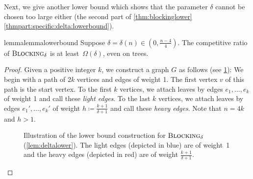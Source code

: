 \documentclass[a4paper,cleveref, autoref, thm-restate, thm-restate, UKenglish]{lipics-v2021}
\newcommand{\blocking}{\textsc{Blocking}}
\begin{document}
Next, we give another lower bound which shows that the parameter $\delta$ cannot be chosen too large either (the second part of \cref{thm:blockinglower}\ref{thmpart:specific:delta:lowerbound}).

\begin{restatable}{lemma}{lemmalowerbound}\label{lem:deltalower}
Suppose $\delta=\delta(n) \in (0,\frac{n-4}{4})$. The competitive ratio of $\blocking_\delta$ is at least~$\Omega(\delta)$, even on trees.
\end{restatable}

\begin{proof}
Given a
positive
integer $k$, 
we construct a graph $G$ as follows (see \cref{fig:lowerconstruction}): We begin with a path of $2k$ vertices and edges of weight 1. The first vertex $v$ of this path is the start vertex. To the first $k$ vertices, we attach leaves by edges $e_1, \dots, e_k$ of weight 1 and call these \emph{light edges}. To the last $k$ vertices, we attach leaves by edges $e_1', \dots, e_k'$ of weight $h\coloneqq\frac{k+1}{\delta+1}$ and call these \emph{heavy edges}. Note that $n=4k$ and $h>1$.

\begin{figure}
\begin{center}
\end{center}
\caption{ Illustration of the lower bound construction for $\blocking_\delta$ (\cref{lem:deltalower}). The light edges (depicted in blue) are of weight~1 and the heavy edges (depicted in red) are of weight $\frac{k+1}{\delta + 1}$.}\label{fig:lowerconstruction}
\end{figure}


\end{proof}
\end{document}
